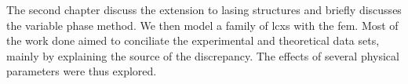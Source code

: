 The second chapter discuss the extension to lasing structures and briefly
discusses the variable phase method. We then model a family of \glspl{lcx}
with the \gls{fem}. Most of the work done aimed to conciliate the 
experimental and theoretical data sets, mainly by explaining the source
of the discrepancy. The effects of several physical parameters were thus explored. 

% 
% 
% 
